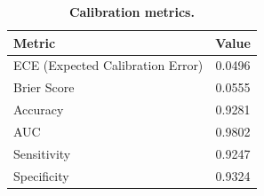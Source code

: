 \begin{table}[t]
\centering
\caption{\textbf{Calibration metrics.}}
\label{tab:calibration}
\begin{tabular}{lc}
\toprule
\textbf{Metric} & \textbf{Value} \\
\midrule
  ECE (Expected Calibration Error) & 0.0496 \\
  Brier Score & 0.0555 \\
  Accuracy & 0.9281 \\
  AUC & 0.9802 \\
  Sensitivity & 0.9247 \\
  Specificity & 0.9324 \\
\bottomrule
\end{tabular}
\end{table}